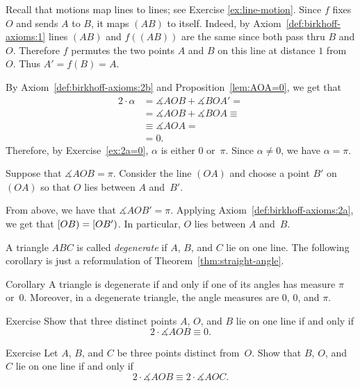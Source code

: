 Recall that motions map lines to lines; see Exercise \ref{ex:line-motion}.
Since $f$ fixes $O$ and sends $A$ to $B$, it maps $(AB)$ to itself.
Indeed, by Axiom~\ref{def:birkhoff-axioms:1} lines $(AB)$ and $f((AB))$ are the same since both pass thru $B$ and $O$.
Therefore $f$ permutes the two points $A$ and $B$ on this line at distance $1$ from $O$.
Thus $A'=f(B)=A$.

By Axiom~\ref{def:birkhoff-axioms:2b} and Proposition~\ref{lem:AOA=0}, we get that
\begin{align*}
2\cdot\alpha&=
\measuredangle AOB+\measuredangle BOA'=
\\
&=\measuredangle AOB+\measuredangle BOA\equiv
\\
&\equiv\measuredangle AOA=
\\
&= 0.
\end{align*}
Therefore, by Exercise~\ref{ex:2a=0}, $\alpha$ is either $0$ or~$\pi$.
Since $\alpha\ne 0$, we have $\alpha=\pi$.


Suppose that $\measuredangle A O B= \pi$.
Consider the line $(OA)$ and choose a point $B'$ on $(OA)$ so that $O$ lies between $A$ and~$B'$.

From above, we have that $\measuredangle AOB'=\pi$.
Applying Axiom~\ref{def:birkhoff-axioms:2a}, 
we get that $[O B)\z=[O B')$.
In particular, $O$ lies between $A$ and~$B$.
\qeds 

A triangle $ABC$ is called 
\emph{degenerate}
if $A$, $B$, and $C$ lie on one line.
The following corollary is just a reformulation of Theorem~\ref{thm:straight-angle}.

\begin{thm}[\abs]{Corollary}\label{cor:degenerate=pi}
A triangle is degenerate if and only if one of its angles
has measure $\pi$ or~$0$.
Moreover, in a degenerate triangle, the angle measures are $0$, $0$, and $\pi$.
\end{thm}

\begin{thm}[!]{Exercise}\label{ex:lineAOB}
Show that three distinct points $A$, $O$, and $B$ lie on one line if and only if 
$$2\cdot \measuredangle AOB\equiv 0.$$ 

\end{thm}

\begin{thm}[!]{Exercise}\label{ex:ABCO-line}
Let $A$, $B$, and $C$ be three points distinct from~$O$.
Show that $B$, $O$, and $C$ lie on one line if and only if
$$2\cdot \measuredangle AOB\equiv 2\cdot \measuredangle AOC.$$ 

\end{thm}

